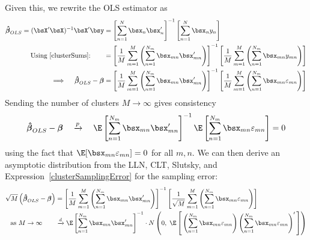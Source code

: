 \documentclass[12pt]{article}
\theoremstyle{plain}
\theoremstyle{definition}
\theoremstyle{remark}
\newcommand{\ra}{\rightarrow}
\newcommand{\bsSigma}{\boldsymbol{\Sigma}}
\newcommand{\bsbeta}{\boldsymbol{\beta}}
\newcommand{\bshatbeta}{\boldsymbol{\hat{\beta}}}
\newcommand{\bshatSigma}{\boldsymbol{\hat{\Sigma}}}
\newcommand{\pto}{\xrightarrow{p}}
\newcommand{\dto}{\xrightarrow{d}}
\newcommand{\sumnN}{\sum^N_{n=1}}
\begin{document}
Given this, we rewrite the OLS estimator as
\begin{align}
  \bshatbeta_{OLS}
  = (\bsX'\bsX)^{-1}\bsX'\bsy
  &=
  \left[
    \sumnN \bsx_n\bsx_n'
  \right]^{-1}
  \left[
    \sumnN
    \bsx_ny_n
  \right] \notag\\
  \text{Using~\ref{clusterSums}:}\qquad
  &=
  \left[
    \frac{1}{M}
    \sum_{m=1}^M \left(\sum_{n=1}^{N_m} \bsx_{mn}\bsx_{mn}'\right)
  \right]^{-1}
  \left[
    \frac{1}{M}
    \sum_{m=1}^M \left(\sum_{n=1}^{N_m} \bsx_{mn}y_{mn} \right)
  \right] \notag\\
  \implies\quad
  \bshatbeta_{OLS} - \bsbeta
  &=
  \left[
    \frac{1}{M}
    \sum_{m=1}^M \left(\sum_{n=1}^{N_m} \bsx_{mn}\bsx_{mn}'\right)
  \right]^{-1}
  \left[
    \frac{1}{M}
    \sum_{m=1}^M \left(\sum_{n=1}^{N_m} \bsx_{mn}\varepsilon_{mn} \right)
  \right]
  \label{clusterSamplingError}
\end{align}
Sending the number of clusters $M\ra\infty$ gives consistency
\begin{align*}
  \bshatbeta_{OLS} - \bsbeta
  \quad\pto\quad
    \E\left[\sum_{n=1}^{N_m} \bsx_{mn}\bsx_{mn}'\right]^{-1}
    \E\left[\sum_{n=1}^{N_m} \bsx_{mn}\varepsilon_{mn} \right]
  = 0
\end{align*}
using the fact that $\E[\bsx_{mn}\varepsilon_{mn}]=0$ for all $m,n$.
We can then derive an asymptotic distribution from the LLN, CLT,
Slutsky, and Expression~\ref{clusterSamplingError} for the sampling
error:
\begin{align*}
  \sqrt{M}\left(\bshatbeta_{OLS} - \bsbeta\right)
  &=
  \left[
    \frac{1}{M}
    \sum_{m=1}^M \left(\sum_{n=1}^{N_m} \bsx_{mn}\bsx_{mn}'\right)
  \right]^{-1}
  \left[
    \frac{1}{\sqrt{M}}
    \sum_{m=1}^M \left(\sum_{n=1}^{N_m} \bsx_{mn}\varepsilon_{mn} \right)
  \right] \\
  \text{as $M\ra\infty$}\qquad
  &\dto
  \E\left[\sum_{n=1}^{N_m} \bsx_{mn}\bsx_{mn}'\right]^{-1}
  \cdot
  N\left(0,\;
    \E\left[\,
      \left(\sum_{n=1}^{N_m} \bsx_{mn}\varepsilon_{mn}\right)
      \left(\sum_{n=1}^{N_m} \bsx_{mn}\varepsilon_{mn}\right)'
    \, \right]
  \right)
\end{align*}
\end{document}
